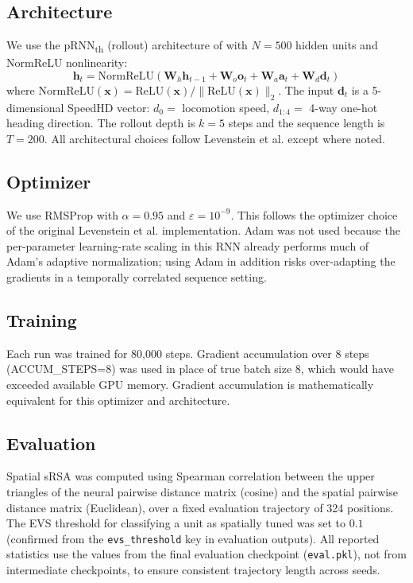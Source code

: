 \documentclass[11pt, a4paper]{article}
\begin{document}
\subsection*{Architecture}
We use the pRNN\textsubscript{th} (rollout) architecture of
\citet{levenstein2024} with $N=500$ hidden units and NormReLU nonlinearity:
\begin{equation}
    \mathbf{h}_t = \text{NormReLU}\!\left(\mathbf{W}_h\mathbf{h}_{t-1} +
    \mathbf{W}_o\mathbf{o}_t + \mathbf{W}_a\mathbf{a}_t +
    \mathbf{W}_d\mathbf{d}_t\right)
\end{equation}
where $\text{NormReLU}(\mathbf{x}) = \text{ReLU}(\mathbf{x}) /
\|\text{ReLU}(\mathbf{x})\|_2$. The input $\mathbf{d}_t$ is a 5-dimensional
SpeedHD vector: $d_0 =$ locomotion speed, $d_{1:4} =$ 4-way one-hot
heading direction. The rollout depth is $k=5$ steps and the sequence
length is $T=200$. All architectural choices follow Levenstein et al.
except where noted.

\subsection*{Optimizer}
We use RMSProp with $\alpha=0.95$ and $\varepsilon=10^{-9}$. This follows
the optimizer choice of the original Levenstein et al. implementation.
Adam was not used because the per-parameter learning-rate scaling in this
RNN already performs much of Adam's adaptive normalization; using Adam in
addition risks over-adapting the gradients in a temporally correlated
sequence setting.

\subsection*{Training}
Each run was trained for 80,000 steps. Gradient accumulation over 8 steps
(ACCUM\_STEPS=8) was used in place of true batch size 8, which would have
exceeded available GPU memory. Gradient accumulation is mathematically
equivalent for this optimizer and architecture.

\subsection*{Evaluation}
Spatial sRSA was computed using Spearman correlation between the upper
triangles of the neural pairwise distance matrix (cosine) and the spatial
pairwise distance matrix (Euclidean), over a fixed evaluation trajectory
of 324 positions. The EVS threshold for classifying a unit as spatially
tuned was set to $0.1$ (confirmed from the \texttt{evs\_threshold} key
in evaluation outputs). All reported statistics use the values from the
final evaluation checkpoint (\texttt{eval.pkl}), not from intermediate
checkpoints, to ensure consistent trajectory length across seeds.
\end{document}
